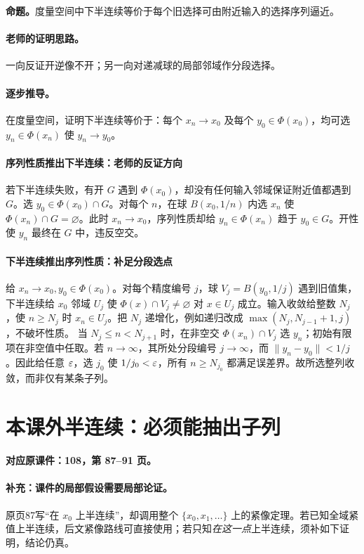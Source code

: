 \textbf{命题。}度量空间中下半连续等价于每个旧选择可由附近输入的选择序列逼近。

\paragraph{老师的证明思路。}一向反证开逆像不开；另一向对递减球的局部邻域作分段选择。

\paragraph{逐步推导。}
在度量空间，证明下半连续等价于：每个 $x_n\to x_0$ 及每个 $y_0\in\Phi(x_0)$，均可选 $y_n\in\Phi(x_n)$ 使 $y_n\to y_0$。
\paragraph{序列性质推出下半连续：老师的反证方向}
若下半连续失败，有开 $G$ 遇到 $\Phi(x_0)$，却没有任何输入邻域保证附近值都遇到 $G$。选 $y_0\in\Phi(x_0)\cap G$。对每个 $n$，在球 $B(x_0,1/n)$ 内选 $x_n$ 使 $\Phi(x_n)\cap G=\varnothing$。此时 $x_n\to x_0$，序列性质却给 $y_n\in\Phi(x_n)$ 趋于 $y_0\in G$。开性使 $y_n$ 最终在 $G$ 中，违反空交。
\paragraph{下半连续推出序列性质：补足分段选点}
给 $x_n\to x_0,y_0\in\Phi(x_0)$。对每个精度编号 $j$，球 $V_j=B(y_0,1/j)$ 遇到旧值集，下半连续给 $x_0$ 邻域 $U_j$ 使 $\Phi(x)\cap V_j\ne\varnothing$ 对 $x\in U_j$ 成立。输入收敛给整数 $N_j$，使 $n\ge N_j$ 时 $x_n\in U_j$。把 $N_j$ 递增化，例如递归改成 $\max(N_j,N_{j-1}+1,j)$，不破坏性质。
当 $N_j\le n<N_{j+1}$ 时，在非空交 $\Phi(x_n)\cap V_j$ 选 $y_n$；初始有限项在非空值中任取。若 $n\to\infty$，其所处分段编号 $j\to\infty$，而 $\|y_n-y_0\|<1/j$。因此给任意 $\varepsilon$，选 $j_0$ 使 $1/j_0<\varepsilon$，所有 $n\ge N_{j_0}$ 都满足误差界。故所选整列收敛，而非仅有某条子列。


\clearpage\section{本课外半连续：必须能抽出子列}\label{g:108:87}

\textbf{对应原课件：108，第 87--91 页。}


\paragraph{补充：课件的局部假设需要局部论证。}
原页87写“在 $x_0$ 上半连续”，却调用整个 $\{x_0,x_1,\ldots\}$ 上的紧像定理。若已知全域紧值上半连续，后文紧像路线可直接使用；若只知\emph{在这一点}上半连续，须补如下证明，结论仍真。

